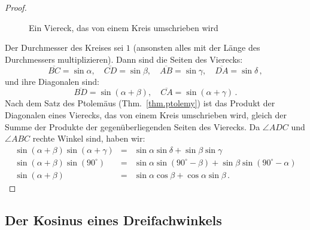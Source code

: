 \begin{proof}
\begin{figure}[t]
\begin{center}
\end{center}
\caption{Ein Viereck, das von einem Kreis umschrieben wird}\label{f.trig-quad-circle}
\end{figure}
Der Durchmesser des Kreises sei $1$ (ansonsten alles mit der Länge des Durchmessers multiplizieren). Dann sind die Seiten des Vierecks:
\[
\overline{BC}=\sin\alpha,\quad \overline{CD}=\sin\beta,\quad \overline{AB}=\sin\gamma,\quad \overline{DA}=\sin\delta\,,
\]
und ihre Diagonalen sind:
\[
\overline{BD}=\sin(\alpha + \beta),\quad \overline{CA}=\sin (\alpha+\gamma)\,.
\]
Nach dem Satz des Ptolemäus (Thm.~\ref{thm.ptolemy}) ist das Produkt der Diagonalen eines Vierecks, das von einem Kreis umschrieben wird, gleich der Summe der Produkte der gegenüberliegenden Seiten des Vierecks. Da $\angle ADC$ und $\angle ABC$ rechte Winkel sind, haben wir:
\[
\renewcommand{\arraystretch}{1.3}
\begin{array}{lcl}
\sin (\alpha+\beta)\sin(\alpha+\gamma)&=&
\sin \alpha \sin\delta + \sin \beta\sin \gamma\\
\sin (\alpha+\beta)\sin(90^\circ)&=&
\sin \alpha \sin(90^\circ-\beta) + \sin \beta\sin (90^\circ-\alpha)\\
\sin (\alpha+\beta)&=&\sin\alpha\cos\beta+\cos\alpha\sin \beta\,.
\end{array}
\]
\end{proof}


\subsection{Der Kosinus eines Dreifachwinkels}\label{s.cosine}

